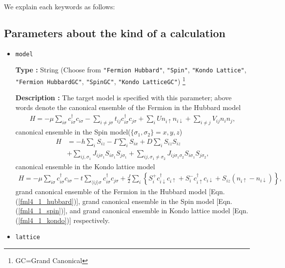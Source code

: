 We explain each keywords as follows:

\subsection{Parameters about the kind of a calculation}

\begin{itemize}

\item \verb|model|

{\bf Type :} String (Choose from \verb|"Fermion Hubbard"|, \verb|"Spin"|, \verb|"Kondo Lattice"|, 
\verb|"Fermion HubbardGC"|, \verb|"SpinGC"|, \verb|"Kondo LatticeGC"|)
\footnote{GC=Grand Canonical}

{\bf Description :} The target model is specified with this parameter;
above words denote the canonical ensemble of the Fermion in the Hubbard model
\begin{align}
H = -\mu \sum_{i \sigma} c^\dagger_{i \sigma} c_{i \sigma} 
- \sum_{i \neq j \sigma} t_{i j} c^\dagger_{i \sigma} c_{j \sigma} 
+ \sum_{i} U n_{i \uparrow} n_{i \downarrow}
+ \sum_{i \neq j} V_{i j} n_{i} n_{j},
\label{fml4_1_hubbard}
\end{align}
canonical ensemble in the Spin model($\{\sigma_1, \sigma_2\}={x, y, z}$)
\begin{align}
H &= -h \sum_{i} S_{i z} - \Gamma \sum_{i} S_{i x} + D \sum_{i} S_{i z} S_{i z}
\nonumber \\
&+ \sum_{i j, \sigma_1}J_{i j \sigma_1} S_{i \sigma_1} S_{j \sigma_1}+ \sum_{i j, \sigma_1 \neq \sigma_2} J_{i j \sigma_1 \sigma_2} S_{i \sigma_1} S_{j \sigma_2} ,
\label{fml4_1_spin}
\end{align}
canonical ensemble in the Kondo lattice model
\begin{align}
H = - \mu \sum_{i \sigma} c^\dagger_{i \sigma} c_{i \sigma} 
- t \sum_{\langle i j \rangle \sigma} c^\dagger_{i \sigma} c_{j \sigma} 
+ \frac{J}{2} \sum_{i} \left\{
S_{i}^{+} c_{i \downarrow}^\dagger c_{i \uparrow}
+ S_{i}^{-} c_{i \uparrow}^\dagger c_{i \downarrow}
+ S_{i z} (n_{i \uparrow} - n_{i \downarrow})
\right\},
\label{fml4_1_kondo}
\end{align}
grand canonical ensemble of the Fermion in the Hubbard model [Eqn. (\ref{fml4_1_hubbard})],
grand canonical ensemble in the Spin model [Eqn. (\ref{fml4_1_spin})],
and
grand canonical ensemble in Kondo lattice model [Eqn. (\ref{fml4_1_kondo})]
respectively.

\item \verb|lattice|


\end{itemize}

